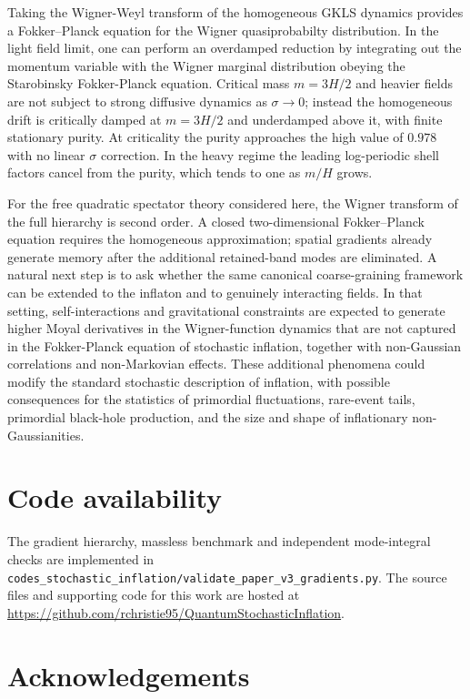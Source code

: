 \documentclass{article}
\numberwithin{equation}{section}
\begin{document}
	Taking the Wigner-Weyl transform of the homogeneous GKLS dynamics provides a Fokker--Planck equation for the Wigner quasiprobabilty distribution. In the light field limit, one can perform an overdamped reduction by integrating out the momentum variable with the Wigner marginal distribution obeying the Starobinsky Fokker-Planck equation. Critical mass $m=3H/2$ and heavier fields are not subject to strong diffusive dynamics as \(\sigma\to0\); instead the homogeneous drift is critically damped at $m=3H/2$ and underdamped above it, with finite stationary purity. At criticality the purity approaches the high value of \(0.978\) with no linear \(\sigma\) correction. In the heavy regime the leading log-periodic shell factors cancel from the purity, which tends to one as \(m/H\) grows.

	For the free quadratic spectator theory considered here, the Wigner transform of the full hierarchy is second order. A closed two-dimensional Fokker--Planck equation requires the homogeneous approximation; spatial gradients already generate memory after the additional retained-band modes are eliminated. A natural next step is to ask whether the same canonical coarse-graining framework can be extended to the inflaton and to genuinely interacting fields. In that setting, self-interactions and gravitational constraints are expected to generate higher Moyal derivatives in the Wigner-function dynamics that are not captured in the Fokker-Planck equation of stochastic inflation, together with non-Gaussian correlations and non-Markovian effects. These additional phenomena could modify the standard stochastic description of inflation, with possible consequences for the statistics of primordial fluctuations, rare-event tails, primordial black-hole production, and the size and shape of inflationary non-Gaussianities.

	\section{Code availability}

	The gradient hierarchy, massless benchmark and independent mode-integral checks are implemented in \texttt{codes\_stochastic\_inflation/validate\_paper\_v3\_gradients.py}. The source files and supporting code for this work are hosted at \url{https://github.com/rchristie95/QuantumStochasticInflation}.

	\section{Acknowledgements}
\end{document}
